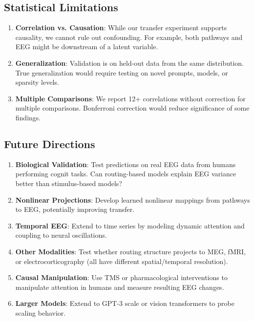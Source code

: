 \subsection{Statistical Limitations}

\begin{enumerate}
    \item \textbf{Correlation vs. Causation}: While our transfer experiment supports causality, we cannot rule out confounding. For example, both pathways and EEG might be downstream of a latent variable.
    
    \item \textbf{Generalization}: Validation is on held-out data from the same distribution. True generalization would require testing on novel prompts, models, or sparsity levels.
    
    \item \textbf{Multiple Comparisons}: We report 12+ correlations without correction for multiple comparisons. Bonferroni correction would reduce significance of some findings.
\end{enumerate}

\subsection{Future Directions}

\begin{enumerate}
    \item \textbf{Biological Validation}: Test predictions on real EEG data from humans performing cognit tasks. Can routing-based models explain EEG variance better than stimulus-based models?
    
    \item \textbf{Nonlinear Projections}: Develop learned nonlinear mappings from pathways to EEG, potentially improving transfer.
    
    \item \textbf{Temporal EEG}: Extend to time series by modeling dynamic attention and coupling to neural oscillations.
    
    \item \textbf{Other Modalities}: Test whether routing structure projects to MEG, fMRI, or electrocorticography (all have different spatial/temporal resolution).
    
    \item \textbf{Causal Manipulation}: Use TMS or pharmacological interventions to manipulate attention in humans and measure resulting EEG changes.
    
    \item \textbf{Larger Models}: Extend to GPT-3 scale or vision transformers to probe scaling behavior.
\end{enumerate}

